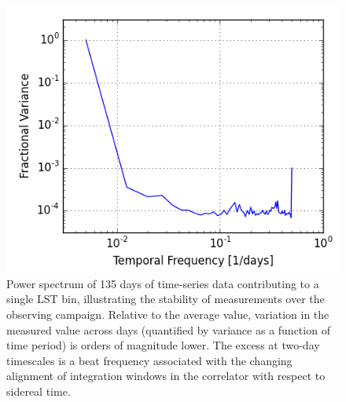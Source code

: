 \documentclass[twocolumn,numberedappendix]{emulateapj} \shorttitle{New Limits on the 21 cm Power Spectrum at $z=8.4$}
\begin{document}
\begin{figure}
\centering
\includegraphics[width=\columnwidth]{plots/stability.png}
\caption{
Power spectrum of 135 days of time-series data contributing to a single LST
bin, illustrating the stability of measurements over the observing campaign.
Relative to the average value, variation in the measured value across days (quantified by
variance as a function of time period) is orders of magnitude lower.
The excess at two-day timescales is a beat frequency associated with
the changing alignment of integration windows in the correlator with respect to
sidereal time. 
}\label{fig:stability}
\end{figure}
\end{document}
